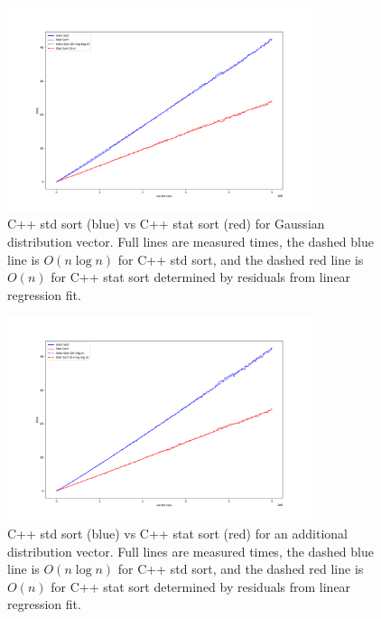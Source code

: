 \documentclass[12pt]{article}
\begin{document}
		\begin{figure}
		\begin{center}
			\includegraphics[width=0.8\textwidth]{fig_perf_gauss}
		\end{center}
			\caption{C++ std sort (blue) vs C++ stat sort (red) for Gaussian distribution vector. Full lines are measured times, the dashed blue line is $O(n \log n)$ for C++ std sort, and the dashed red line is $O(n)$ for C++ stat sort determined by residuals from linear regression fit.}
		
		\label{fig2}
		\end{figure}		

		\begin{figure}
		\begin{center}
			\includegraphics[width=0.8\textwidth]{fig_perf_weird}
		\end{center}
			\caption{C++ std sort (blue) vs C++ stat sort (red) for an additional distribution vector. Full lines are measured times, the dashed blue line is $O(n \log n)$ for C++ std sort, and the dashed red line is $O(n)$ for C++ stat sort determined by residuals from linear regression fit.}
		
		\label{fig3}
		\end{figure}		
		
\end{document}
